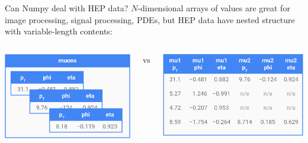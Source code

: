 \documentclass[aspectratio=169]{beamer}
\begin{document}
\begin{frame}[fragile]{Can Numpy deal with HEP data?}
\vspace{0.2 cm}
$N$-dimensional arrays of values are great for image processing, signal processing, PDEs, but HEP data have nested structure with variable-length contents:

\vspace{0.25 cm}
\begin{columns}
\includegraphics[width=\linewidth]{muons-as-objects.png}

\centering vs

\includegraphics[width=\linewidth]{muons-as-a-table.png}
\end{columns}


\end{frame}
\end{document}
